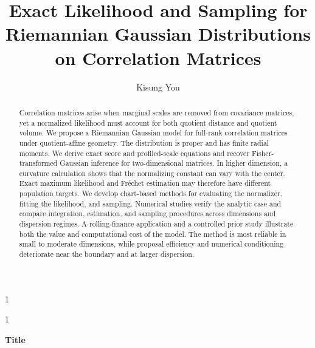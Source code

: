 \documentclass[
  12pt]{article}
\newcommand{\Frechet}{Fr\'{e}chet\xspace}
\newcommand{\anon}{1}
\begin{document}
\def\spacingset#1{\renewcommand{\baselinestretch}%
{#1}\small\normalsize} \spacingset{1}




\anon
{
  \title{\bf Exact Likelihood and Sampling for Riemannian Gaussian Distributions on Correlation Matrices}
    \author{Kisung You}
\date{}
  \maketitle
} \fi

\anon
{
  \bigskip
  \bigskip
  \bigskip
  \begin{center}
    {\LARGE\bf Title}
\end{center}
  \medskip
} \fi

\bigskip
\begin{abstract}
Correlation matrices arise when marginal scales are removed from covariance matrices, yet a normalized likelihood must account for both quotient distance and quotient volume. We propose a Riemannian Gaussian model for full-rank correlation matrices under quotient-affine geometry. The distribution is proper and has finite radial moments. We derive exact score and profiled-scale equations and recover Fisher-transformed Gaussian inference for two-dimensional matrices. In higher dimension, a curvature calculation shows that the normalizing constant can vary with the center. Exact maximum likelihood and \Frechet estimation may therefore have different population targets. We develop chart-based methods for evaluating the normalizer, fitting the likelihood, and sampling. Numerical studies verify the analytic case and compare integration, estimation, and sampling procedures across dimensions and dispersion regimes. A rolling-finance application and a controlled prior study illustrate both the value and computational cost of the model. The method is most reliable in small to moderate dimensions, while proposal efficiency and numerical conditioning deteriorate near the boundary and at larger dispersion.
\end{abstract}
\end{document}
